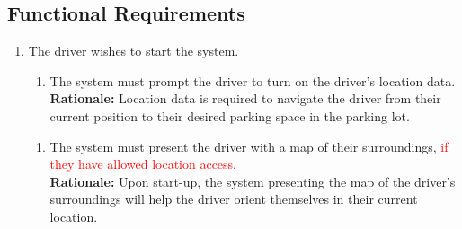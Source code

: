 \documentclass[12pt,letterpaper]{article}
\newcounter{businesseventnum}
\newcounter{funcreqnum}
\begin{document}
\subsection{Functional Requirements}
\begin{enumerate}[{BE}\thebusinesseventnum.] 
\item The driver wishes to start the system.
\begin{enumerate}[{FR}\thefuncreqnum.] 
    \item The system must prompt the driver to turn on the driver's location
    data.\\
    \textbf{Rationale:} Location data is required to navigate the driver from
    their current position to their desired parking space in the parking lot.
\end{enumerate}
\begin{enumerate}[{FR}\thefuncreqnum.] 
    \item The system must present the driver with a map of their surroundings,
    \textcolor{red}{if they have allowed location access}.\\
    \textbf{Rationale:} Upon start-up, the system presenting the map of the
    driver's surroundings will help the driver orient themselves in their
    current location.
\end{enumerate}
\end{enumerate}
\end{document}
